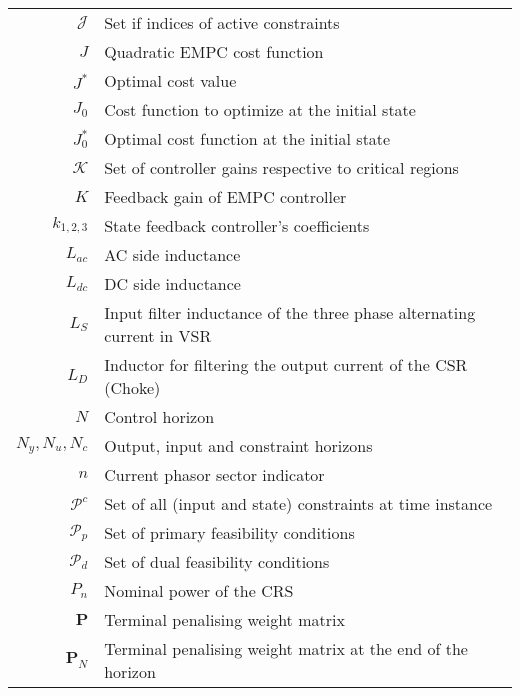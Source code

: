 \begin{scriptsize}
\begin{tabularx}{\textwidth}{r|X}
  $\mathcal{J}$                     & Set if indices of active constraints\\
  $J$                               & Quadratic EMPC cost function\\
  $J^*$                             & Optimal cost value\\
  $J_0$                             & Cost function to optimize at the initial state\\
  $J^*_0$                           & Optimal cost function at the initial state\\
  
  $\mathcal{K}$                     & Set of controller gains respective to critical regions\\
  $K$                               & Feedback gain of EMPC controller\\
  $k_{1,2,3}$                       & State feedback controller's coefficients\\
  
  $L_{ac}$                          & AC side inductance\\
  $L_{dc}$                          & DC side inductance\\
  $L_S$															& Input filter inductance of the three phase alternating current in VSR\\
  $L_D$															& Inductor for filtering the output current of the CSR (Choke)\\
  
  $N$                               & Control horizon\\
  $N_y,N_u,N_c$                     & Output, input and constraint horizons\\
  $n$                               & Current phasor sector indicator\\
  
  $\mathcal{P}^c$               & Set of all (input and state) constraints at time instance\\
  $\mathcal{P}_p$             & Set of primary feasibility conditions\\
  $\mathcal{P}_d$             & Set of dual feasibility conditions\\
  $P_n$                             & Nominal power of the CRS\\
  $\textbf{P}$                    & Terminal penalising weight matrix\\
  $\textbf{P}_N$                    & Terminal penalising weight matrix at the end of the horizon\\
  

\end{tabularx}
\end{scriptsize}
